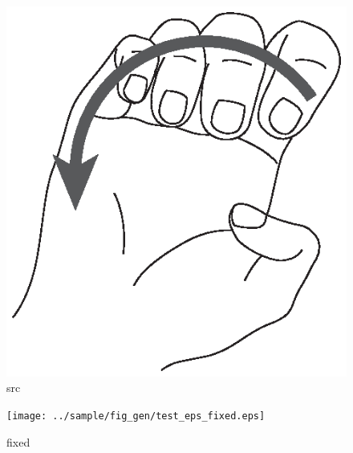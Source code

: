 \documentclass[11pt]{article}
\begin{document}
  \begin{figure}[htbp]
    \begin{center}
      \includegraphics[width=\linewidth]{../sample/fig_sample/test_eps.eps}
    \end{center}
    \caption{src}
  \end{figure}

\begin{figure}[htbp]
  \begin{center}
    \texttt{[image: ../sample/fig\_gen/test\_eps\_fixed.eps]}
  \end{center}
  \caption{fixed}
\end{figure}
\end{document}
